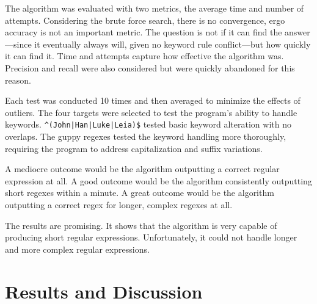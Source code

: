\documentclass[10pt,twocolumn]{article}
\begin{document}
The algorithm was evaluated with two metrics, the average time and number of attempts. Considering the brute force search, there is no convergence, ergo accuracy is not an important metric. The question is not if it can find the answer—since it eventually always will, given no keyword rule conflict—but how quickly it can find it. Time and attempts capture how effective the algorithm was. Precision and recall were also considered but were quickly abandoned for this reason.

Each test was conducted 10 times and then averaged to minimize the effects of outliers. The four targets were selected to test the program's ability to handle keywords. \texttt{\^{}(John|Han|Luke|Leia)\$} tested basic keyword alteration with no overlaps. The guppy regexes tested the keyword handling more thoroughly, requiring the program to address capitalization and suffix variations.

A mediocre outcome would be the algorithm outputting a correct regular expression at all. A good outcome would be the algorithm consistently outputting short regexes within a minute. A great outcome would be the algorithm outputting a correct regex for longer, complex regexes at all.

The results are promising. It shows that the algorithm is very capable of producing short regular expressions. Unfortunately, it could not handle longer and more complex regular expressions.

\section{Results and Discussion}

\begin{table}[h]
\centering
{}
\label{tbl:timeline}
\caption{Test Results: Average of 10 Trials}
\end{table}
\end{document}

